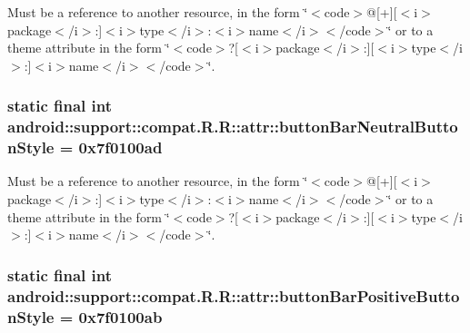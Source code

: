 Must be a reference to another resource, in the form \char`\"{}$<$code$>$@\mbox{[}+\mbox{]}\mbox{[}$<$i$>$package$<$/i$>$:\mbox{]}$<$i$>$type$<$/i$>$:$<$i$>$name$<$/i$>$$<$/code$>$\char`\"{} or to a theme attribute in the form \char`\"{}$<$code$>$?\mbox{[}$<$i$>$package$<$/i$>$:\mbox{]}\mbox{[}$<$i$>$type$<$/i$>$:\mbox{]}$<$i$>$name$<$/i$>$$<$/code$>$\char`\"{}. \hypertarget{classandroid_1_1support_1_1compat_1_1_r_1_1attr_324d21526888238435b0311287fb072b}{
\subsubsection[{buttonBarNeutralButtonStyle}]{\setlength{\rightskip}{0pt plus 5cm}static final int android::support::compat.R.R::attr::buttonBarNeutralButtonStyle = 0x7f0100ad}}
\label{classandroid_1_1support_1_1compat_1_1_r_1_1attr_324d21526888238435b0311287fb072b}


Must be a reference to another resource, in the form \char`\"{}$<$code$>$@\mbox{[}+\mbox{]}\mbox{[}$<$i$>$package$<$/i$>$:\mbox{]}$<$i$>$type$<$/i$>$:$<$i$>$name$<$/i$>$$<$/code$>$\char`\"{} or to a theme attribute in the form \char`\"{}$<$code$>$?\mbox{[}$<$i$>$package$<$/i$>$:\mbox{]}\mbox{[}$<$i$>$type$<$/i$>$:\mbox{]}$<$i$>$name$<$/i$>$$<$/code$>$\char`\"{}. \hypertarget{classandroid_1_1support_1_1compat_1_1_r_1_1attr_2a2318882b5eba74257e973a9d6ef89e}{
\subsubsection[{buttonBarPositiveButtonStyle}]{\setlength{\rightskip}{0pt plus 5cm}static final int android::support::compat.R.R::attr::buttonBarPositiveButtonStyle = 0x7f0100ab}}
\label{classandroid_1_1support_1_1compat_1_1_r_1_1attr_2a2318882b5eba74257e973a9d6ef89e}


